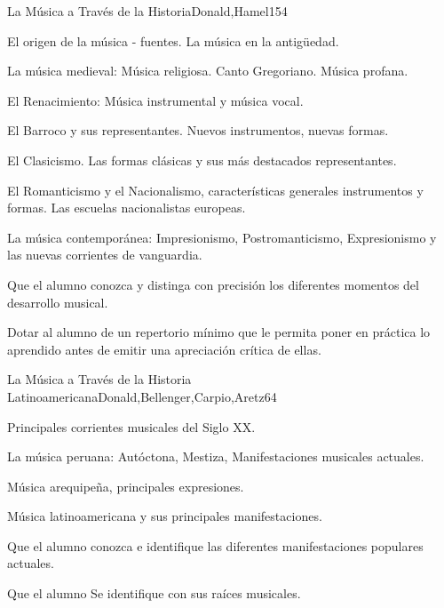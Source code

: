 \begin{syllabus}
\begin{unit}{La Música a Través de la Historia}{Donald,Hamel}{15}{4}
\begin{topics}
	\item El origen de la música - fuentes. La música en la antigüedad.
	\item La música medieval: Música religiosa.  Canto Gregoriano. Música profana.
	\item El Renacimiento: Música instrumental y música vocal.
	\item El Barroco y sus representantes. Nuevos instrumentos, nuevas formas.
	\item El Clasicismo. Las formas clásicas y sus más destacados representantes.
	\item El Romanticismo y el Nacionalismo, características generales instrumentos y formas. Las escuelas nacionalistas europeas.
	\item La música contemporánea: Impresionismo, Postromanticismo, Expresionismo y las nuevas corrientes de vanguardia.
\end{topics}
\begin{learningoutcomes}
	\item Que el alumno conozca y distinga con precisión los diferentes momentos del desarrollo musical.
	\item Dotar al alumno de un repertorio mínimo que le permita poner en práctica lo aprendido antes de emitir una apreciación crítica de ellas.
\end{learningoutcomes}
\end{unit}

\begin{unit}{La Música a Través de la Historia Latinoamericana}{Donald,Bellenger,Carpio,Aretz}{6}{4}
\begin{topics}
	\item Principales corrientes musicales del Siglo XX.
	\item La música peruana: Autóctona, Mestiza, Manifestaciones musicales actuales.
	\item Música arequipeña, principales expresiones.
	\item Música latinoamericana y sus principales manifestaciones.
\end{topics}
\begin{learningoutcomes}
	\item Que el alumno conozca e identifique las diferentes manifestaciones populares actuales. 
	\item Que el alumno Se identifique con sus raíces musicales.
\end{learningoutcomes}
\end{unit}



\begin{coursebibliography}
\end{coursebibliography}

\end{syllabus}
